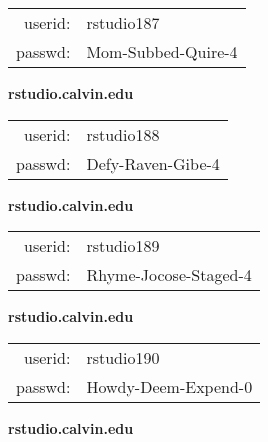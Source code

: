 \documentclass{article}\usepackage[]{graphicx}\usepackage[]{color}
\begin{document}
\begin{multicols}{3}
\begin{minipage}{.3\textwidth}
\begin{tabular}{rl}
userid: & rstudio187\\
passwd: & Mom-Subbed-Quire-4

\vspace{5mm}

\end{tabular}\end{minipage}

\vspace{5mm}

\begin{minipage}{.3\textwidth}
\centerline{\textbf{rstudio.calvin.edu}}
\medskip
\begin{tabular}{rl}

userid: & rstudio188\\
passwd: & Defy-Raven-Gibe-4

\vspace{5mm}

\end{tabular}\end{minipage}

\vspace{5mm}

\begin{minipage}{.3\textwidth}
\centerline{\textbf{rstudio.calvin.edu}}
\medskip
\begin{tabular}{rl}

userid: & rstudio189\\
passwd: & Rhyme-Jocose-Staged-4

\vspace{5mm}

\end{tabular}\end{minipage}

\vspace{5mm}

\begin{minipage}{.3\textwidth}
\centerline{\textbf{rstudio.calvin.edu}}
\medskip
\begin{tabular}{rl}

userid: & rstudio190\\
passwd: & Howdy-Deem-Expend-0

\vspace{5mm}

\end{tabular}\end{minipage}

\vspace{5mm}

\begin{minipage}{.3\textwidth}
\centerline{\textbf{rstudio.calvin.edu}}
\medskip
\begin{tabular}{rl}


\end{tabular}
\end{minipage}
\end{multicols}
\end{document}
